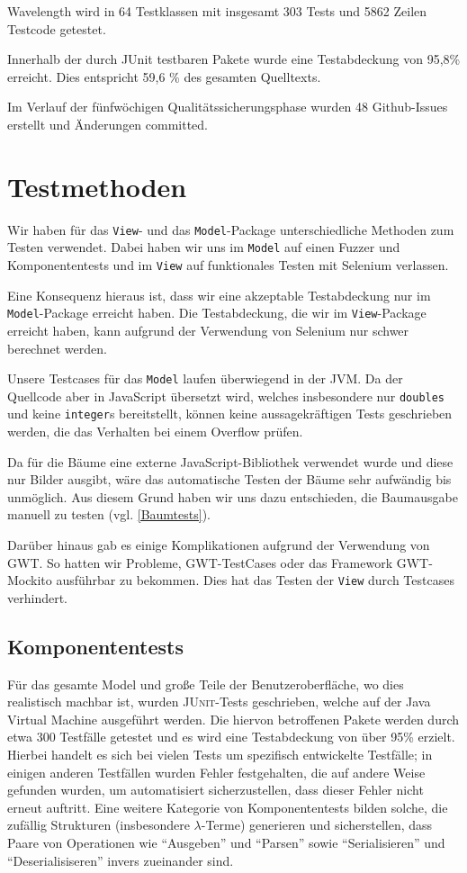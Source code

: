 \documentclass[parskip=full,11pt,openany]{scrreprt}
\begin{document}
Wavelength wird in 64 Testklassen mit insgesamt 303 Tests
und 5862 Zeilen Testcode getestet.

Innerhalb der durch JUnit testbaren Pakete wurde eine 
Testabdeckung von 95,8\% erreicht. Dies entspricht 59,6 \%
des gesamten Quelltexts.

Im Verlauf der fünfwöchigen Qualitätssicherungsphase wurden
48 Github-Issues erstellt und Änderungen committed.


\chapter{Testmethoden}
Wir haben für das \texttt{View}- und das \texttt{Model}-Package unterschiedliche
Methoden zum Testen verwendet. Dabei haben wir uns im \texttt{Model} auf einen
Fuzzer und Komponententests und im \texttt{View} auf funktionales Testen mit
Selenium verlassen.

Eine Konsequenz hieraus ist, dass wir eine akzeptable Testabdeckung nur im
\texttt{Model}-Package erreicht haben. Die Testabdeckung, die wir im
\texttt{View}-Package erreicht haben, kann aufgrund der Verwendung von Selenium
nur schwer berechnet werden.

Unsere Testcases für das \texttt{Model} laufen überwiegend in der JVM. Da der
Quellcode aber in JavaScript übersetzt wird, welches insbesondere nur
\texttt{doubles} und keine \texttt{integer}s bereitstellt, können keine
aussagekräftigen Tests geschrieben werden, die das Verhalten bei einem Overflow
prüfen.

Da für die Bäume eine externe JavaScript-Bibliothek verwendet wurde und diese
nur Bilder ausgibt, wäre das automatische Testen der Bäume sehr aufwändig bis
unmöglich. Aus diesem Grund haben wir uns dazu entschieden, die Baumausgabe
manuell zu testen (vgl. \ref{Baumtests}).

Darüber hinaus gab es einige Komplikationen aufgrund der Verwendung von GWT.
So hatten wir Probleme, GWT-TestCases oder das Framework GWT-Mockito ausführbar
zu bekommen. Dies hat das Testen der \texttt{View} durch Testcases verhindert.

\section{Komponententests}
Für das gesamte Model und große Teile der Benutzeroberfläche, wo dies realistisch
machbar ist, wurden \textsc{JUnit}-Tests geschrieben, welche auf der Java Virtual
Machine ausgeführt werden. Die hiervon betroffenen Pakete werden durch etwa 300
Testfälle getestet und es wird eine Testabdeckung von über 95\% erzielt. Hierbei
handelt es sich bei vielen Tests um spezifisch entwickelte Testfälle; in einigen
anderen Testfällen wurden Fehler festgehalten, die auf andere Weise gefunden
wurden, um automatisiert sicherzustellen, dass dieser Fehler nicht erneut
auftritt. Eine weitere Kategorie von Komponententests bilden solche, die zufällig Strukturen
(insbesondere $\lambda$-Terme) generieren und sicherstellen, dass Paare von
Operationen wie \enquote{Ausgeben} und \enquote{Parsen} sowie \enquote{Serialisieren}
und \enquote{Deserialisiseren} invers zueinander sind.
\end{document}
